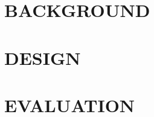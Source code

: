 \documentclass[twocolumn,10pt]{asme2e}
\begin{document}
\section*{BACKGROUND}

\subsection*{}


\subsubsection*{}


\section*{DESIGN}


\subsection*{}
\subsection*{} 
\subsection*{}
\subsection*{}


\section*{EVALUATION}

\subsection*{}

\subsection*{} 
\end{document}

